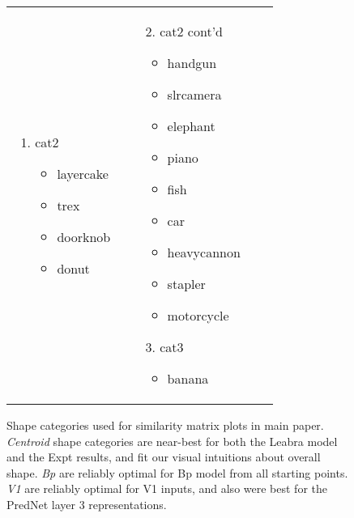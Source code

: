 \documentclass[12pt,twoside]{article}
\newif\myifpdf
\begin{document}
\begin{figure}
\begin{tabular}{llll}
{\begin{enumerate}
\begin{itemize}
	\item tablelamp
	\item chair
	\end{itemize}
	\item cat2
	\begin{itemize}
	\item layercake
	\item trex
	\item doorknob
	\item donut
	\end{itemize}
	\end{enumerate}
	} & 
	 \parbox[t]{1.7in}{\raggedright 	\baselineskip0pt
	\begin{enumerate}
	\item[2.] cat2 cont'd
	\begin{itemize}
	\item handgun
	\item slrcamera
	\item elephant
	\item piano
	\item fish
	\item car
	\item heavycannon
	\item stapler
	\item motorcycle
	\end{itemize}
	\item[3.] cat3
	\begin{itemize}
	\item banana
	\end{itemize}
	\end{enumerate}
	}\\
	\end{tabular}
	\caption{Shape categories used for similarity matrix plots in main paper.  {\em Centroid} shape categories are near-best for both the Leabra model and the Expt results, and fit our visual intuitions about overall shape. {\em Bp} are reliably optimal for Bp model from all starting points.  {\em V1} are reliably optimal for V1 inputs, and also were best for the PredNet layer 3 representations.}
	\label{fig.cats}
\end{figure}
\end{document}
